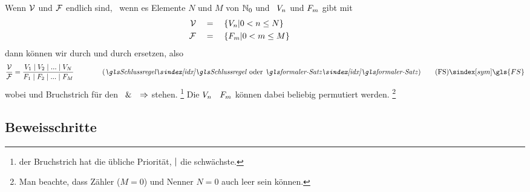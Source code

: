 Wenn $\prerequisiteset$ und $\conclusionset$ endlich sind, \textdh\ wenn es Elemente $N$ und $M$ von $\mathbb{N}_0$ und \Aussagen\ $V_n$ und $F_m$ gibt mit
\begin{align}
	\mathcal{V} & \quad = \quad \{V_n | 0 < n \le N \}
	\label{def:Voraussetzungen} \\
	\mathcal{F}     & \quad = \quad \{F_m     | 0 < m \le M \}
	\label{def:Folgerungen} &&&&&&&&&&
\end{align}
dann können wir \seqqt{$\prerequisiteset$} durch  und \seqqt{$\conclusionset$} durch  ersetzen, also \textzB\
\[
	\frac{\prerequisiteset}{\conclusionset} =
	\frac
		{\prerequisite_1 \srand \prerequisite_2 \srand ...\srand \prerequisite_N}
		{\conclusion_1     \srand \conclusion_2     \srand ...\srand \conclusion_M    }
	\qquad \qquad \text{(\emph{\Schlussregel} oder \emph{\formalerSatz})}
	\tag{\tagFS} \sym{\gls{FS}} \label{def:formalerSatz}
\]
wobei \chrqt{$\srand$} und Bruchstrich für den \Metaoperator\ $\&$ \textbzw\ $\Rightarrow$ stehen.%
\footnote{%
	der Bruchstrich hat die übliche Priorität, $\srand$ die schwächste.
}
Die $V_n$ \textbzw\ $F_m$ können dabei beliebig permutiert werden.%
\footnote{%
	Man beachte, dass Zähler ($M=0$) und Nenner $N=0$ auch leer sein können.
}

\subsection{Beweisschritte}%
\label{sub:Beweisschritte}

